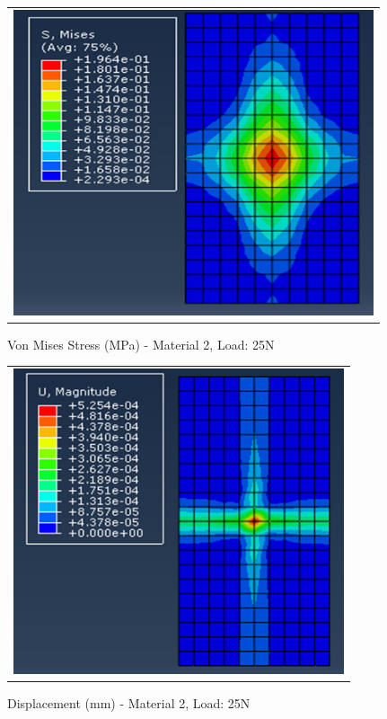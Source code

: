 \documentclass[a4paper,12pt]{article}
\numberwithin{equation}{section}
\numberwithin{figure}{section}
\begin{document}
\begin{figure}[H]
  \centering
  \begin{tabular}{@{}c@{}}
    \includegraphics[width=0.7\linewidth,height=255pt]{Results/Point Loading/M2_VMS_L5.png} \\
  \end{tabular}
  \caption{Von Mises Stress (MPa) - Material 2, Load: 25N}
\end{figure}

\begin{figure}[H]
  \centering
  \begin{tabular}{@{}c@{}}
    \includegraphics[width=0.7\linewidth,height=255pt]{Results/Point Loading/M2_DIS_L5.png} \\
  \end{tabular}
  \caption{Displacement (mm) - Material 2, Load: 25N}
\end{figure}
\end{document}
